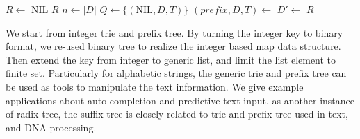 \documentclass[b5paper]{article}
\begin{document}
\begin{algorithmic}[1]
  \State $R \gets $ NIL
    \State \Return $R$
  \EndIf
  \State $n \gets |D|$
  \State $Q \gets \{(\text{NIL}, D, T)\}$
    \State $(\textit{prefix}, D, T) \gets$ 
      \State $D' \gets$ 
       
        \State {} 
        \State {}
      \EndIf
    \EndFor
  \EndWhile
  \State \Return $R$
\EndFunction
\end{algorithmic}

We start from integer trie and prefix tree. By turning the integer key to binary format, we re-used binary tree to realize the integer based map data structure. Then extend the key from integer to generic list, and limit the list element to finite set. Particularly for alphabetic strings, the generic trie and prefix tree can be used as tools to manipulate the text information. We give example applications about auto-completion and predictive text input. as another instance of radix tree, the suffix tree is closely related to trie and prefix tree used in text, and DNA processing.

\begin{Exercise}\label{ex:prefix-tree-app}
\end{Exercise}
\end{document}
